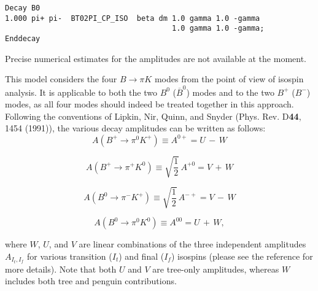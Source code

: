\Example

\begin{verbatim}
Decay B0
1.000 pi+ pi-  BT02PI_CP_ISO  beta dm 1.0 gamma 1.0 -gamma
                                      1.0 gamma 1.0 -gamma;
Enddecay
\end{verbatim}

\Notes
Precise numerical estimates for the amplitudes are not available at the moment.




\label{btokpicpiso}



\Expl
This model considers the four $B \rightarrow \pi K$ modes from the point of view of isospin analysis.  It is applicable to both the two $B^{0}$ ($\overline{B}^{0}$) modes and to the two $B^{+}$ ($B^{-}$) modes, as all four modes should indeed be treated together in this approach.  Following the conventions of Lipkin, Nir, Quinn, and Snyder (Phys. Rev. D{\bf 44}, 1454 (1991)), the various decay amplitudes can be written as follows:
\begin{equation}
A(B^{+} \rightarrow \pi^{0} K^{+}) \equiv A^{0+} = U\,-\,W 
\end{equation}  

\begin{equation}
A(B^{+} \rightarrow \pi^{+} K^{0}) \equiv \sqrt{\frac{1}{2}} \,A^{+0} = V\,+\,W 
\end{equation} 

\begin{equation}
A(B^{0} \rightarrow \pi^{-} K^{+}) \equiv \sqrt{\frac{1}{2}} \,A^{-+} = V\,-\,W 
\end{equation}

\begin{equation}
A(B^{0} \rightarrow \pi^{0} K^{0}) \equiv A^{00} = U\,+\,W,  
\end{equation}

where $W$, $U$, and $V$ are linear combinations of the three independent amplitudes $A_{I_{t},I_{f}}$ for various transition ($I_{t}$) and final ($I_{f}$) isospins (please see the reference for more details).  Note that both $U$ and $V$ are tree-only amplitudes, whereas $W$ includes both tree and penguin contributions.

